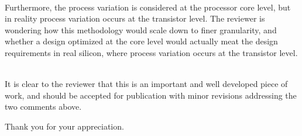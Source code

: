 \begin{reviewer}
\\
Furthermore, the process variation is considered at the processor core level,
but in reality process variation occurs at the transistor level. The reviewer
is wondering how this methodology would scale down to finer granularity, and
whether a design optimized at the core level would actually meat the design
requirements in real silicon, where process variation occurs at the transistor
level.
\end{reviewer}

\begin{authors}
\begin{actions}
\end{actions}
\end{authors}

\begin{reviewer}
\\
It is clear to the reviewer that this is an important and well developed
piece of work, and should be accepted for publication with minor revisions
addressing the two comments above.
\end{reviewer}

\begin{authors}
  Thank you for your appreciation.
\end{authors}
